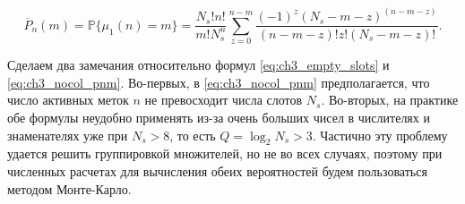 \begin{equation}\label{eq:ch3_nocol_pnm}
	\overline{P}_n(m) = \mathbb{P}\{ \mu_1(n) = m \} = \frac{N_s! n!}{m! N_s^n} \sum\limits_{z=0}^{n-m}
		\frac{(-1)^z (N_s - m - z)^{(n - m - z)}}{(n - m - z)! z! (N_s - m - z)!}.
\end{equation}

Сделаем два замечания относительно формул \eqref{eq:ch3_empty_slots} и \eqref{eq:ch3_nocol_pnm}. Во-первых, в \eqref{eq:ch3_nocol_pnm} предполагается, что число активных меток $n$ не превосходит числа слотов $N_s$. Во-вторых, на практике обе формулы неудобно применять из-за очень больших чисел в числителях и знаменателях уже при $N_s > 8$, то есть $Q = \log_2 N_s > 3$. Частично эту проблему удается решить группировкой множителей, но не во всех случаях, поэтому при численных расчетах для вычисления обеих вероятностей будем пользоваться методом Монте-Карло.

